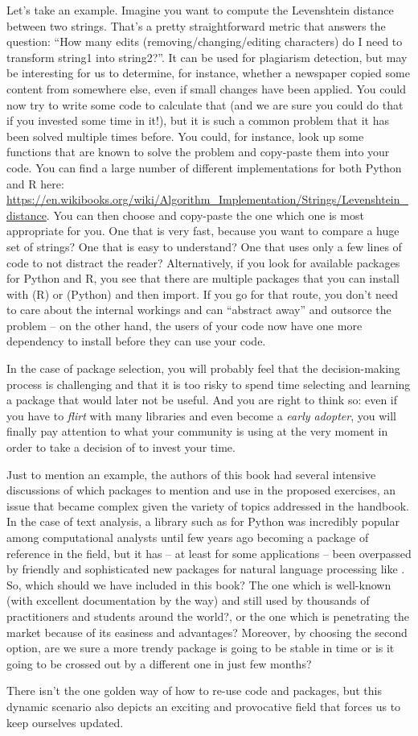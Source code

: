Let's take an example. Imagine you want to compute the Levenshtein distance between two
strings. That's a pretty straightforward metric that answers the question: ``How many
edits (removing/changing/editing characters) do I need to transform string1 into string2?''.
It can be used for plagiarism detection, but may be interesting for us to determine, for instance,
whether a newspaper copied some content from somewhere else, even if small changes have been
applied. You could now try to write some code to calculate that (and we are sure you could
do that if you invested some time in it!), but it is such a common problem that it
has been solved multiple times before. You could, for instance,  look up some
functions that are known to solve the problem and copy-paste them into your code. You can find
a large number of different implementations for both Python and R here:
\url{https://en.wikibooks.org/wiki/Algorithm_Implementation/Strings/Levenshtein\_distance}.
You can then choose and copy-paste the one which one is most appropriate for you. One that is very fast, because
you want to compare a huge set of strings? One that is easy to understand? One that uses
only a few lines of code to not distract the reader?
Alternatively, if you look for available packages for Python and R, you see that there are
multiple packages that you can install with  (R) or  (Python)
and then import. If you go for that route, you don't need
to care about the internal workings and can ``abstract away'' and outsorce the problem -- on the other
hand, the users of your code now have one more dependency to install before they can
use your code.

In the case of package selection, you will probably feel that the decision-making process is challenging and that it is too risky to spend time selecting and learning a package that would later not be useful. And you are right to think so: even if you have to  \textit{flirt} with many libraries and even become a \textit{early adopter}, you will finally pay attention to what your community is using at the very moment in order to take a decision of to invest your time. 

Just to mention an example, the authors of this book had several intensive discussions of which packages to mention and use in the proposed exercises, an issue that became complex given the variety of topics addressed in the handbook. In the case of text analysis, a library such as  for Python was incredibly popular among computational analysts until few years ago becoming a package of reference in the field, but it has -- at least for some applications -- been overpassed by friendly and sophisticated new packages for natural language processing like . So, which should we have included in this book? The one which is well-known (with excellent documentation by the way) and still used by thousands of practitioners and students around the world?, or the one which is penetrating the market because of its easiness and advantages? Moreover, by choosing the second option, are we sure a more trendy package is going to be stable in time or is it going to be crossed out by a different one in just few months?  

There isn't the one golden way of how to re-use code and packages, but this dynamic scenario also depicts an exciting and provocative field that forces us to keep ourselves updated.
